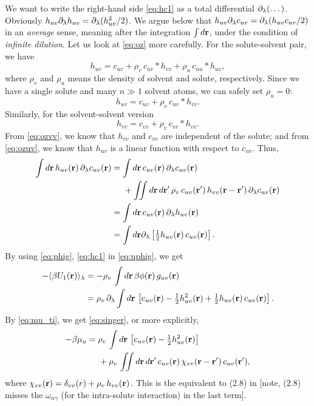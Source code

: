 \documentclass[12pt]{article}
\begin{document}
We want to write the right-hand side \eqref{eq:hc1} as
a total differential $\partial_\lambda(\dots)$.
%
Obviously $h_{uv} \partial_\lambda h_{uv} = \partial_\lambda ( h_{uv}^2/2 )$.
%
We argue below that $h_{uv} \partial_\lambda c_{uv} = \partial_\lambda ( h_{uv} c_{uv} /2) $
in an \emph{average} sense, meaning after the integration $\int d\mathbf{r}$,
under the condition of \emph{infinite dilution}.
Let us look at \eqref{eq:oz} more carefully.
%
For the solute-solvent pair, we have
\[
  h_{uv} = c_{uv} + \rho_v \, c_{uv}*h_{vv}
  + \rho_u \, c_{uu}*h_{uv},
\]
where $\rho_v$ and $\rho_u$ means the density of
solvent and solute, respectively.
%
Since we have a single solute and many $n \gg 1$ solvent atoms,
we can safely set $\rho_u = 0$:
\begin{equation}
  h_{uv} = c_{uv} + \rho_v \, c_{uv}*h_{vv}.
  \label{eq:ozuv}
\end{equation}
%
Similarly, for the solvent-solvent version
\begin{equation}
  h_{vv} = c_{vv} + \rho_v \, c_{vv}*h_{vv}.
  \label{eq:ozvv}
\end{equation}
From \eqref{eq:ozvv}, we know that
  $h_{vv}$ and $c_{vv}$ are independent of the solute;
and from \eqref{eq:ozuv}, we know that
  $h_{uv}$ is a linear function with respect to $c_{uv}$.
%
Thus,
\begin{align}
  \int d\mathbf{r} \, h_{uv}(\mathbf{r}) \, \partial_\lambda c_{uv}(\mathbf{r})
  &=
  \int d\mathbf{r} \,
  c_{uv}(\mathbf{r}) \, \partial_\lambda c_{uv}(\mathbf{r}) \notag \\
  & \;\;\;\;\;
    +
    \iint d\mathbf{r} \, d\mathbf{r}'
    \, \rho_v
    \, c_{uv}(\mathbf{r}')
    \, h_{vv}(\mathbf{r} - \mathbf{r}')
    \, \partial_\lambda c_{uv}(\mathbf{r}) \notag \\
  &= \int d\mathbf{r} \, c_{uv}(\mathbf{r}) \, \partial_\lambda h_{uv}(\mathbf{r}) \notag \\
  &= \int d\mathbf{r} \partial_\lambda
    \left[
      \tfrac{1}{2} h_{uv}(\mathbf{r}) \,  c_{uv}(\mathbf{r})
    \right].
  \label{eq:phig}
\end{align}
%
By using \eqref{eq:phig}, \eqref{eq:hc1} in \eqref{eq:uphig}, we get
%
\begin{align}
  - \langle
  \beta U_1(\mathbf{r})
  \rangle_\lambda
  &=
  - \rho_v \,
  \int d \mathbf{r}
  \, \beta \phi(\mathbf{r}) \, g_{uv}(\mathbf{r}) \notag \\
  &=
   \rho_v \, \partial_\lambda \int d \mathbf{r} \,
   \left[
    c_{uv}(\mathbf{r})
    - \tfrac{1}{2} h_{uv}^2(\mathbf{r})
    + \tfrac{1}{2} h_{uv}(\mathbf{r}) \, c_{uv}(\mathbf{r})
    \right].
\end{align}
%
%
%
By \eqref{eq:mu_ti}, we get \eqref{eq:singer}, or more explicitly,
\begin{align}
  -\beta \mu_u
  &=
   \rho_v \, \int
    d \mathbf{r} \,
   \left[
     c_{uv}(\mathbf{r})
    - \tfrac{1}{2} h_{uv}^2(\mathbf{r})
    \right]
  \notag \\
  & \;\;\;\;\;
    +
    \rho_v \, \iint d\mathbf{r} \, d\mathbf{r}'
    \, c_{uv}(\mathbf{r})
    \, \chi_{vv}(\mathbf{r} - \mathbf{r}')
    \, c_{uv}(\mathbf{r}'),
 \label{eq:muexpanded}
\end{align}
where
$\chi_{vv}(\mathbf{r}) = \delta_{vv}(r) + \rho_v \, h_{vv}(\mathbf{r})$.
%
This is the equivalent to (2.8) in \cite{singer}
[note,
(2.8) misses the $\omega_{\alpha\gamma}$ (for the intra-solute interaction)
in the last term].
\end{document}
